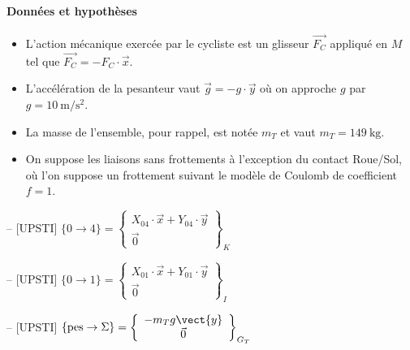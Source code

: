 \paragraph*{Données et hypothèses}
\begin{itemize}
  \item L'action mécanique exercée par le cycliste est un glisseur \(\overrightarrow{F_{C}}\) appliqué en \(M\) tel que \(\overrightarrow{F_{C}}=-F_{C} \cdot \vec{x}\).
  \item L'accélération de la pesanteur vaut \(\vec{g}=-g \cdot \vec{y}\) où on approche \(g\) par \(g=10 \mathrm{~m} / \mathrm{s}^{2}\).
  \item La masse de l'ensemble, pour rappel, est notée \(m_{T}\) et vaut \(m_{T}=149 \mathrm{~kg}\).
  \item On suppose les liaisons sans frottements à l'exception du contact Roue/Sol, où l'on suppose un frottement suivant le modèle de Coulomb de coefficient \(f=1\).
\end{itemize}

\ifprof
\begin{corrige}-- [UPSTI]
$\{0 \rightarrow 4\}=\left\{\begin{array}{c}
X_{04} \cdot \vec{x}+Y_{04} \cdot \vec{y} \\
\vec{0}
\end{array}\right\}_{K}
$
\end{corrige}
\else
\fi

\ifprof
\begin{corrige}-- [UPSTI]
$\{0 \rightarrow 1\}=\left\{\begin{array}{c}
X_{01} \cdot \vec{x}+Y_{01} \cdot \vec{y} \\
\vec{0}
\end{array}\right\}_{I}
$
\end{corrige}
\else
\fi

\ifprof
\begin{corrige}-- [UPSTI]
$\{\text{pes} \rightarrow \Sigma \}=\left\{\begin{array}{c}
-m_T g\vect{y}  \\
\vec{0}
\end{array}\right\}_{G_T}
$

\end{corrige}
\else
\fi

